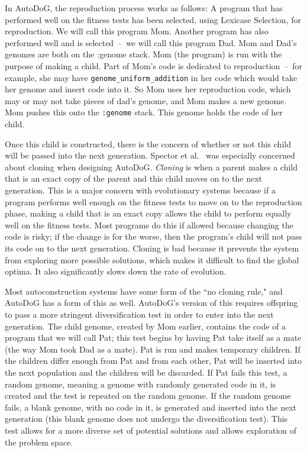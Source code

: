 \documentclass{sig-alternate}
\begin{document}
In AutoDoG, the reproduction process works as follows:
A program that has performed well on the fitness tests has been selected, using Lexicase Selection, for reproduction. We will call this program Mom. Another program has also performed well and is selected~--~we will call this program Dad. Mom and Dad's genomes are both on the :genome stack. Mom (the program) is run with the purpose of making a child. Part of Mom's code is dedicated to reproduction~--~for example, she may have \texttt{genome\_uniform\_addition} in her code which would take her genome and insert code into it. So Mom uses her reproduction code, which may or may not take pieces of dad's genome, and Mom makes a new genome. Mom pushes this onto the \texttt{:genome} stack. This genome holds the code of her child.

Once this child is constructed, there is the concern of whether or not this child will be passed into the next generation. Spector et al.~\cite{spector:2016} was especially concerned about cloning when designing AutoDoG. \textit{Cloning} is when a parent makes a child that is an exact copy of the parent and this child moves on to the next generation. This is a major concern with evolutionary systems because if a program performs well enough on the fitness tests to move on to the reproduction phase, making a child that is an exact copy allows the child to perform equally well on the fitness tests. Most programs do this if allowed because changing the code is risky; if the change is for the worse, then the program's child will not pass its code on to the next generation. Cloning is bad because it prevents the system from exploring more possible solutions, which makes it difficult to find the global optima. It also significantly slows down the rate of evolution.

Most autoconstruction systems have some form of the ``no cloning rule," and AutoDoG has a form of this as well. AutoDoG's version of this requires offspring to pass a more stringent diversification test in order to enter into the next generation. The child genome, created by Mom earlier, contains the code of a program that we will call Pat; this test begins by having Pat take itself as a mate (the way Mom took Dad as a mate). Pat is run and makes temporary children. If the children differ enough from Pat and from each other, Pat will be inserted into the next population and the children will be discarded. If Pat fails this test, a random genome, meaning a genome with randomly generated code in it, is created and the test is repeated on the random genome. If the random genome fails, a blank genome, with no code in it, is generated and inserted into the next generation (this blank genome does not undergo the diversification test). This test allows for a more diverse set of potential solutions and allows exploration of the problem space.
\end{document}
